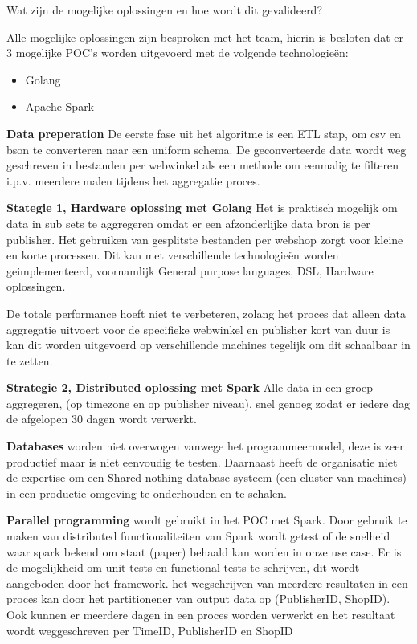 Wat zijn de mogelijke oplossingen en hoe wordt dit gevalideerd?




Alle mogelijke oplossingen zijn besproken met het team, hierin is besloten dat er 3 mogelijke POC's worden uitgevoerd met de volgende technologieën:

\begin{itemize}
    \item Golang
    \item Apache Spark
\end{itemize}

\textbf{Data preperation}
De eerste fase uit het algoritme is een ETL stap, om csv en bson te converteren naar een uniform schema.
De geconverteerde data wordt weg geschreven in bestanden per webwinkel als een methode om eenmalig te filteren i.p.v. meerdere malen tijdens het aggregatie proces.


\textbf{Stategie 1, Hardware oplossing met Golang}
Het is praktisch mogelijk om data in sub sets te aggregeren omdat er een afzonderlijke data bron is per publisher.
Het gebruiken van gesplitste bestanden per webshop zorgt voor kleine  en korte processen. Dit kan met verschillende technologieën worden geimplementeerd, voornamlijk General purpose languages, DSL, Hardware oplossingen.

De totale performance hoeft niet te verbeteren, zolang het proces dat alleen data aggregatie uitvoert voor de specifieke webwinkel en publisher kort van duur is kan dit worden uitgevoerd op verschillende machines tegelijk om dit schaalbaar in te zetten.

\textbf{Strategie 2, Distributed oplossing met Spark}
Alle data in een groep aggregeren, (op timezone en op publisher niveau). snel genoeg zodat er iedere dag de afgelopen 30 dagen wordt verwerkt.


\textbf{Databases} worden niet overwogen vanwege het programmeermodel, deze is zeer productief maar is niet eenvoudig te testen. Daarnaast heeft de organisatie niet de expertise om een Shared nothing database systeem (een cluster van machines) in een productie omgeving te onderhouden en te schalen.

\textbf{Parallel programming} wordt gebruikt in het POC met Spark. Door gebruik te maken van distributed functionaliteiten van Spark wordt getest of de snelheid waar spark bekend om staat (paper) behaald kan worden in onze use case. Er is de mogelijkheid om unit tests en functional tests te schrijven, dit wordt aangeboden door het framework.
het wegschrijven van meerdere resultaten in een proces kan door het partitionener van output data op (PublisherID, ShopID). Ook kunnen er meerdere dagen in een proces worden verwerkt en het resultaat wordt weggeschreven per TimeID, PublisherID en ShopID


